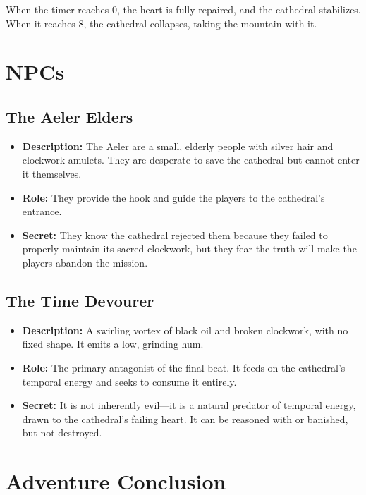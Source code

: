 \documentclass{article}
\begin{document}
When the timer reaches 0, the heart is fully repaired, and the cathedral stabilizes. When it reaches 8, the cathedral collapses, taking the mountain with it.

\section{NPCs}

\subsection{The Aeler Elders}

\begin{itemize}
    \item \textbf{Description:} The Aeler are a small, elderly people with silver hair and clockwork amulets. They are desperate to save the cathedral but cannot enter it themselves.
    \item \textbf{Role:} They provide the hook and guide the players to the cathedral's entrance.
    \item \textbf{Secret:} They know the cathedral rejected them because they failed to properly maintain its sacred clockwork, but they fear the truth will make the players abandon the mission.
\end{itemize}

\subsection{The Time Devourer}

\begin{itemize}
    \item \textbf{Description:} A swirling vortex of black oil and broken clockwork, with no fixed shape. It emits a low, grinding hum.
    \item \textbf{Role:} The primary antagonist of the final beat. It feeds on the cathedral's temporal energy and seeks to consume it entirely.
    \item \textbf{Secret:} It is not inherently evil---it is a natural predator of temporal energy, drawn to the cathedral's failing heart. It can be reasoned with or banished, but not destroyed.
\end{itemize}

\section{Adventure Conclusion}
\end{document}
